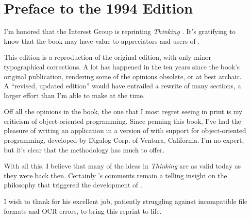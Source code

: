 \chapter*{Preface to the 1994 Edition}\label{preface94}
\pagestyle{headings}

\initial I'm honored that the \Forth{} Interest Group is reprinting
\emph{Thinking \Forth{}.} It's gratifying to know that the book may
have value to appreciators and users of \Forth{}.

This edition is a reproduction of the original edition, with only
minor typographical corrections. A lot has happened in the ten years
since the book's original publication, rendering some of the opinions
obsolete, or at best archaic. A ``revised, updated edition'' would
have entrailed a rewrite of many sections, a larger effort than I'm
able to make at the time.

Off all the opinions in the book, the one that I most regret seeing in
print is my criticism of object-oriented programming. Since penning
this book, I've had the pleasure of writing an application in a
version of \Forth{} with support for object-oriented programming,
developed by Digalog Corp. of Ventura, California. I'm no expert, but
it's clear that the methodology has much to offer.

With all this, I believe that many of the ideas in \emph{Thinking
\Forth{}} are as valid today as they were back then. Certainly 's comments remain a telling insight on the philosophy that
triggered the development of \Forth{}.

I wish to thank  for his excellent job, patiently
struggling against incompatible file formats and OCR errors, to bring
this reprint to life.

